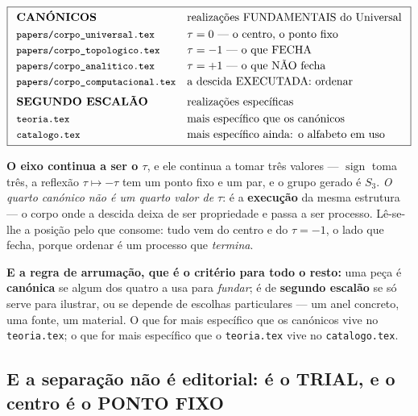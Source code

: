 \documentclass[11pt,a4paper]{article}
\newcommand{\code}[1]{\texttt{\small #1}}
\begin{document}
\[
\boxed{
\begin{array}{ll}
\textbf{CANÓNICOS} & \text{realizações FUNDAMENTAIS do Universal}\\[3pt]
\code{papers/corpo\_universal.tex} & \tau=0\ \text{--- o centro, o ponto fixo}\\[2pt]
\code{papers/corpo\_topologico.tex} & \tau=-1\ \text{--- o que FECHA}\\[2pt]
\code{papers/corpo\_analitico.tex} & \tau=+1\ \text{--- o que NÃO fecha}\\[2pt]
\code{papers/corpo\_computacional.tex} & \text{a descida EXECUTADA: ordenar}\\[6pt]
\textbf{SEGUNDO ESCALÃO} & \text{realizações específicas}\\[3pt]
\code{teoria.tex} & \text{mais específico que os canónicos}\\[2pt]
\code{catalogo.tex} & \text{mais específico ainda: o alfabeto em uso}
\end{array}}
\]

\noindent\textbf{O eixo continua a ser o $\tau$}, e ele continua a tomar três valores ---
$\operatorname{sign}$ toma três, a reflexão $\tau\mapsto-\tau$ tem um ponto fixo e um par, e
o grupo gerado é $S_3$. \emph{O quarto canónico não é um quarto valor de $\tau$}: é a
\textbf{execução} da mesma estrutura --- o corpo onde a descida deixa de ser propriedade e
passa a ser processo. Lê-se-lhe a posição pelo que consome: tudo vem do centro e do
$\tau=-1$, o lado que fecha, porque ordenar é um processo que \emph{termina}.

\medskip
\noindent\textbf{E a regra de arrumação, que é o critério para todo o resto:} uma peça é
\textbf{canónica} se algum dos quatro a usa para \emph{fundar}; é de \textbf{segundo
escalão} se só serve para ilustrar, ou se depende de escolhas particulares --- um anel
concreto, uma fonte, um material. O que for mais específico que os canónicos vive no
\code{teoria.tex}; o que for mais específico que o \code{teoria.tex} vive no
\code{catalogo.tex}.

\subsection*{E a separação não é editorial: é o TRIAL, e o centro é o PONTO FIXO}
\end{document}
